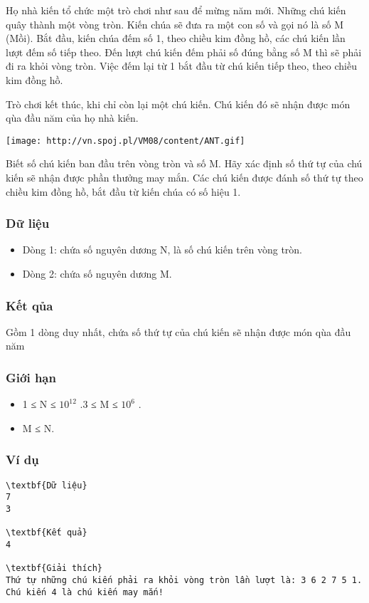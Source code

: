 







   Họ nhà kiến tổ chức một trò chơi như sau để mừng năm mới. Những chú kiến quây thành một vòng tròn. Kiến chúa sẽ   đưa ra một con số và gọi nó là số M (Mồi). Bắt đầu, kiến chúa đếm số 1, theo chiều kim đồng hồ, các chú kiến lần lượt   đếm số tiếp theo. Đến lượt chú kiến đếm phải số đúng bằng số M thì sẽ phải đi ra khỏi vòng tròn. Việc đếm lại từ 1 bắt đầu   từ chú kiến tiếp theo, theo chiều kim đồng hồ.  

   Trò chơi kết thúc, khi chỉ còn lại một chú kiến. Chú kiến đó sẽ nhận được món qùa đầu năm của họ nhà kiến.  


\texttt{[image: http://vn.spoj.pl/VM08/content/ANT.gif]}

   Biết số chú kiến ban đầu trên vòng tròn và số M. Hãy xác định số thứ tự của chú kiến sẽ nhận được phần thưởng may   mắn. Các chú kiến được đánh số thứ tự theo chiều kim đồng hồ, bắt đầu từ kiến chúa có số hiệu 1.  

\subsubsection{   Dữ liệu  }
\begin{itemize}
	\item     Dòng 1: chứa số nguyên dương N, là số chú kiến trên vòng tròn.   
	\item     Dòng 2: chứa số nguyên dương M.   
\end{itemize}

\subsubsection{   Kết qủa  }

   Gồm 1 dòng duy nhất, chứa số thứ tự của chú kiến sẽ  nhận được món qùa đầu năm  

\subsubsection{   Giới hạn  }
\begin{itemize}
	\item     1 ≤ N ≤ $10^{12}$    .3 ≤ M ≤ $10^{6}$    .   
	\item     M ≤ N.   
\end{itemize}

\subsubsection{   Ví dụ  }
\begin{verbatim}
\textbf{Dữ liệu}
7 
3

\textbf{Kết quả}
4

\textbf{Giải thích}
Thứ tự những chú kiến phải ra khỏi vòng tròn lần lượt là: 3 6 2 7 5 1.
Chú kiến 4 là chú kiến may mắn!
\end{verbatim}

